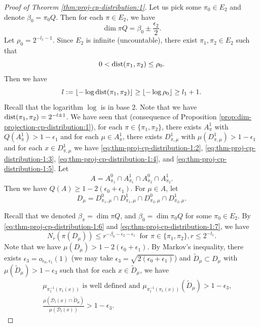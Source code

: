 \documentclass[10pt,a4paper]{amsart}
\DeclareMathOperator{\dist}{{\rm dist}}
\def\D{\mathcal{D}}
\begin{document}
\begin{proof}[Proof of Theorem \ref{thm:proj-cp-distribution:1}]
Let us pick some $\pi_0\in E_2$ and denote  $\beta_0=\pi_0 Q$.  Then for each $\pi\in E_2$, we have 
\[
\dim \pi Q = \beta_0\pm \frac{\epsilon_2}{2} .
\]
Let $\rho_0=2^{-l_1-1}$.   
 Since $E_2$ is infinite (uncountable), there exist $\pi_1,\pi_2\in E_2$ such that 
\begin{equation}\label{eq:thm-proj-cp-distribution-1:8}
0<\dist(\pi_1,  \pi_2)\le \rho_0. 
\end{equation}
Then  we have 
\[
l:=\lfloor -\log \dist(\pi_1,\pi_2) \rfloor \ge \lfloor -\log \rho_0 \rfloor \ge l_1+1.
\]
Recall that the logarithm $\log$ is in base 2. Note that we have $\dist (\pi_1,\pi_2)=2^{-l\pm 1}$.  We have seen that (consequence of Proposition \ref{prop:dim-projection-cp-distribution:1}),  for each $\pi\in \{\pi_1,\pi_2\}$, there exists $A_{\pi}^1$ with $Q(A_\pi^1)>1-\epsilon_1$ and for each $\mu\in A_\pi^1$, there exists $D_{\pi,\mu}^1$ with $\mu(D_{\pi,\mu}^1)>1-\epsilon_1$ and for each $x\in D_{\pi,\mu}^1$ we have  \eqref{eq:thm-proj-cp-distribution-1:2},  \eqref{eq:thm-proj-cp-distribution-1:3}, \eqref{eq:thm-proj-cp-distribution-1:4}, and \eqref{eq:thm-proj-cp-distribution-1:5}.
Let 
\[
A=A_{\pi_1}^0 \cap A_{\pi_1}^1 \cap A_{\pi_2}^0 \cap A_{\pi_2}^1. 
\]
Then we have $Q(A)\ge 1-2(\epsilon_0+\epsilon_1)$.   For $\mu\in A$, let 
\[
D_\mu=D_{\pi_1,\mu}^0 \cap D_{\pi_1,\mu}^1 \cap D_{\pi_2,\mu}^0 \cap D_{\pi_2,\mu}^1.
\]

Recall that we denoted $\beta_\pi=\dim \pi Q$,   and   $\beta_0=\dim \pi_0 Q$ for some $\pi_0\in E_2$.  By \eqref{eq:thm-proj-cp-distribution-1:6} and \eqref{eq:thm-proj-cp-distribution-1:7},  we have
\begin{equation}\label{eq:thm-proj-cp-distribution-1:9}
N_{r}(\pi(D_\mu)) \le r^{-\beta_0-\epsilon_2- \epsilon_1} \ \textrm{ for } \pi\in\{\pi_1,\pi_2\},r\le 2^{-l_1}.
\end{equation}
Note that we have  $\mu(D_\mu)>1-2(\epsilon_0+\epsilon_1)$.
By Markov's inequality,  there exists $\epsilon_3=o_{\epsilon_0,\epsilon_1}(1)$ (we may take $\epsilon_3=\sqrt{2(\epsilon_0+\epsilon_1)}$) and $\tilde{D}_\mu\subset D_\mu$ with $\mu(\tilde{D}_\mu)>1-\epsilon_3$ such that for each $x\in \tilde{D}_\mu$,   we have 
\begin{eqnarray}
 & & \mu_{\pi_1^{-1}(\pi_1(x))} \textrm{ is well defined and }   \mu_{\pi_1^{-1}(\pi_1(x))}(\tilde{D}_\mu) >1-\epsilon_3, \label{eq:thm-proj-cp-distribution-1:i}\\
& & \frac{\mu(\D_l(x)\cap \tilde{D}_\mu)}{\mu(\D_l(x))} > 1-\epsilon_3. \label{eq:thm-proj-cp-distribution-1:iii}
\end{eqnarray}


\end{proof}
\end{document}
